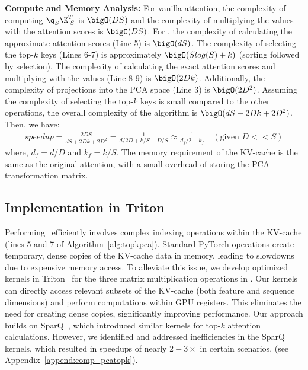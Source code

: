 \vspace{0.08in}
\noindent \textbf{Compute and Memory Analysis:} For vanilla attention, the
complexity of computing $\q_S\K_{:S}^{T}$ is $\bigO(DS)$ and the complexity of
multiplying the values with the attention scores is $\bigO(DS)$. For \method,
the complexity of calculating the approximate attention scores (Line 5) is
$\bigO(dS)$. The complexity of selecting the top-$k$ keys (Lines 6-7) is
approximately $\bigO(Slog(S) + k)$ (sorting followed by selection). The
complexity of calculating the exact attention scores and multiplying with the
values (Line 8-9) is $\bigO(2Dk)$. Additionally, the complexity of projections
into the PCA space (Line 3) is $\bigO(2D^2)$. Assuming the complexity of
selecting the top-$k$ keys is small compared to the other operations, the
overall complexity of the algorithm is $\bigO(dS + 2Dk + 2D^2)$. Then, we have:
\begin{align} speedup = \frac{2DS}{dS + 2Dk + 2D^2}  = \frac{1}{d/2D + k/S +
D/S} \approx \frac{1}{d_f/2 + k_f} \hspace{1em}(\text{given }D << S)
\end{align} where, $d_{f} = d/D$ and $k_{f} = k/S$. The memory requirement of
the KV-cache is the same as the original attention, with a small overhead of
storing the PCA transformation matrix.

\subsection{Implementation in Triton} \label{sec:kernel}

Performing \method~efficiently involves complex indexing operations within the
KV-cache (lines 5 and 7 of Algorithm~\ref{alg:topkpca}).  Standard PyTorch
operations create temporary, dense copies of the KV-cache data in memory,
leading to slowdowns due to expensive memory access. To alleviate this issue,
we develop optimized kernels in Triton~\citep{triton:openai} for the three
matrix multiplication operations in \method.  Our kernels can directly access
relevant subsets of the KV-cache (both feature and sequence dimensions) and
perform computations within GPU registers. This eliminates the need for
creating dense copies, significantly improving performance. Our approach builds
on SparQ~\citep{ribar2023sparq}, which introduced similar kernels for top-$k$
attention calculations. However, we identified and addressed inefficiencies in
the SparQ kernels, which resulted in speedups of nearly $2-3\times$ in certain
scenarios.  (see Appendix~\ref{append:comp_pcatopk}).

